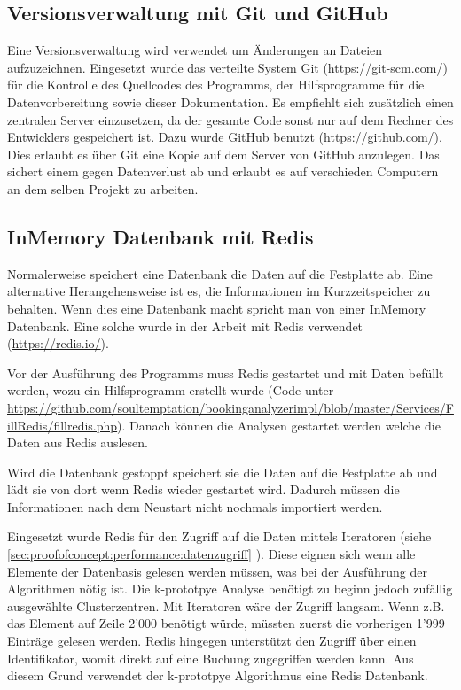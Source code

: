 \subsection{Versionsverwaltung mit Git und GitHub}
Eine Versionsverwaltung wird verwendet um Änderungen an Dateien aufzuzeichnen. Eingesetzt wurde das verteilte System Git (\url{https://git-scm.com/}) für die Kontrolle des Quellcodes des Programms, der Hilfsprogramme für die Datenvorbereitung sowie dieser Dokumentation. Es empfiehlt sich zusätzlich einen zentralen Server einzusetzen, da der gesamte Code sonst nur auf dem Rechner des Entwicklers gespeichert ist. Dazu wurde GitHub benutzt (\url{https://github.com/}). Dies erlaubt es über Git eine Kopie auf dem Server von GitHub anzulegen. Das sichert einem gegen Datenverlust ab und erlaubt es auf verschieden Computern an dem selben Projekt zu arbeiten.

\subsection{InMemory Datenbank mit Redis}
\label{sec:proofofconcept:externebibliotheken:redis}
Normalerweise speichert eine Datenbank die Daten auf die Festplatte ab. Eine alternative Herangehensweise ist es, die Informationen im Kurzzeitspeicher zu behalten. Wenn dies eine Datenbank macht spricht man von einer InMemory Datenbank. Eine solche wurde in der Arbeit mit Redis verwendet (\url{https://redis.io/}).

Vor der Ausführung des Programms muss Redis gestartet und mit Daten befüllt werden, wozu ein Hilfsprogramm erstellt wurde (Code unter \url{https://github.com/soultemptation/bookinganalyzerimpl/blob/master/Services/FillRedis/fillredis.php}). Danach können die Analysen gestartet werden welche die Daten aus Redis auslesen. 

Wird die Datenbank gestoppt speichert sie die Daten auf die Festplatte ab und lädt  sie von dort wenn Redis wieder gestartet wird. Dadurch müssen die Informationen nach dem Neustart nicht nochmals importiert werden.

Eingesetzt wurde Redis für den Zugriff auf die Daten mittels Iteratoren (siehe \cref{sec:proofofconcept:performance:datenzugriff} ). Diese eignen sich wenn alle Elemente der Datenbasis gelesen werden müssen, was bei der Ausführung der Algorithmen nötig ist. Die k-prototpye Analyse benötigt zu beginn jedoch zufällig ausgewählte Clusterzentren. Mit Iteratoren wäre der Zugriff langsam. Wenn z.B. das Element auf Zeile 2'000 benötigt würde, müssten zuerst die vorherigen 1'999 Einträge gelesen werden. Redis hingegen unterstützt den Zugriff über einen Identifikator, womit direkt auf eine Buchung zugegriffen werden kann. Aus diesem Grund verwendet der k-prototpye Algorithmus eine Redis Datenbank.


